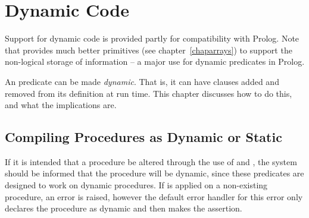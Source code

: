 %
% 
% 
% 
% 

\chapter{Dynamic Code}
\label{chapdynamic}

Support for dynamic code is provided partly for compatibility with
Prolog. Note that \eclipse provides much better primitives (see
chapter~\ref{chaparrays}) to support the non-logical storage of information
-- a major use for dynamic  predicates in Prolog. 

An {\eclipse} predicate can be made \emph{dynamic}.
That is, it can have clauses added and removed from its definition at run
time.
This chapter discusses how to do this, and what the implications are.

\section{Compiling Procedures as Dynamic or Static}
\label{compdynamic}

If it is intended that
a procedure be altered through the use of  and ,
the system should be informed that the procedure will be dynamic,
since these predicates are
designed to work on dynamic procedures. 
If  is applied on a non-existing procedure, an error
is raised, however the default error handler for this error
only declares the procedure as dynamic and then makes the assertion.

